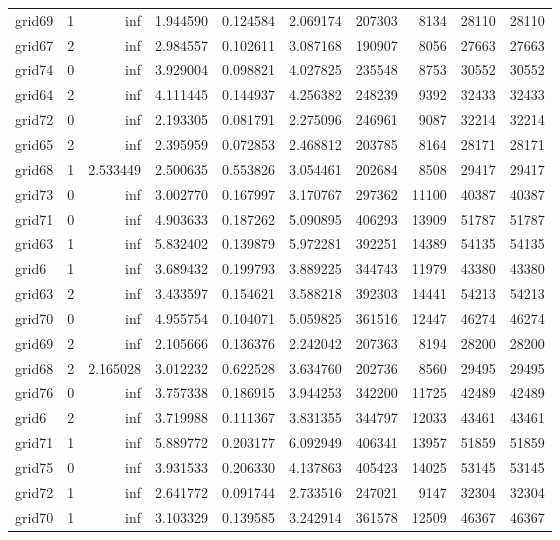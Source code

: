 \begin{longtable}{|l|r|r|r|r|r|r|r|r|r|}
grid69 & 1 & inf & 1.944590 & 0.124584 & 2.069174 & 207303 & 8134 & 28110 & 28110 \\
grid67 & 2 & inf & 2.984557 & 0.102611 & 3.087168 & 190907 & 8056 & 27663 & 27663 \\
grid74 & 0 & inf & 3.929004 & 0.098821 & 4.027825 & 235548 & 8753 & 30552 & 30552 \\
grid64 & 2 & inf & 4.111445 & 0.144937 & 4.256382 & 248239 & 9392 & 32433 & 32433 \\
grid72 & 0 & inf & 2.193305 & 0.081791 & 2.275096 & 246961 & 9087 & 32214 & 32214 \\
grid65 & 2 & inf & 2.395959 & 0.072853 & 2.468812 & 203785 & 8164 & 28171 & 28171 \\
grid68 & 1 & 2.533449 & 2.500635 & 0.553826 & 3.054461 & 202684 & 8508 & 29417 & 29417 \\
grid73 & 0 & inf & 3.002770 & 0.167997 & 3.170767 & 297362 & 11100 & 40387 & 40387 \\
grid71 & 0 & inf & 4.903633 & 0.187262 & 5.090895 & 406293 & 13909 & 51787 & 51787 \\
grid63 & 1 & inf & 5.832402 & 0.139879 & 5.972281 & 392251 & 14389 & 54135 & 54135 \\
grid6 & 1 & inf & 3.689432 & 0.199793 & 3.889225 & 344743 & 11979 & 43380 & 43380 \\
grid63 & 2 & inf & 3.433597 & 0.154621 & 3.588218 & 392303 & 14441 & 54213 & 54213 \\
grid70 & 0 & inf & 4.955754 & 0.104071 & 5.059825 & 361516 & 12447 & 46274 & 46274 \\
grid69 & 2 & inf & 2.105666 & 0.136376 & 2.242042 & 207363 & 8194 & 28200 & 28200 \\
grid68 & 2 & 2.165028 & 3.012232 & 0.622528 & 3.634760 & 202736 & 8560 & 29495 & 29495 \\
grid76 & 0 & inf & 3.757338 & 0.186915 & 3.944253 & 342200 & 11725 & 42489 & 42489 \\
grid6 & 2 & inf & 3.719988 & 0.111367 & 3.831355 & 344797 & 12033 & 43461 & 43461 \\
grid71 & 1 & inf & 5.889772 & 0.203177 & 6.092949 & 406341 & 13957 & 51859 & 51859 \\
grid75 & 0 & inf & 3.931533 & 0.206330 & 4.137863 & 405423 & 14025 & 53145 & 53145 \\
grid72 & 1 & inf & 2.641772 & 0.091744 & 2.733516 & 247021 & 9147 & 32304 & 32304 \\
grid70 & 1 & inf & 3.103329 & 0.139585 & 3.242914 & 361578 & 12509 & 46367 & 46367 \\

\end{longtable}
